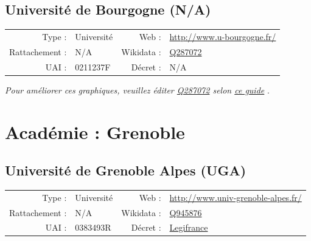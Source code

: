 \documentclass[12pt,french,landscape]{article}
\begin{document}
\hypertarget{universituxe9-de-bourgogne-na}{%
\subsection{Université de Bourgogne
(N/A)}\label{universituxe9-de-bourgogne-na}}

\begin{tabular*}{0.45\textwidth}{rp{2cm}rl}  
\hline  
Type : & Université & Web : &\href{http://www.u-bourgogne.fr/}{http://www.u-bourgogne.fr/} \\  
Rattachement : & N/A & Wikidata : & \href{https://www.wikidata.org/entity/Q287072}{Q287072} \\  
UAI : & 0211237F & Décret : & N/A \\  
\hline  
\end{tabular*}

\textit{\scriptsize Pour améliorer ces graphiques, veuillez éditer \href{https://www.wikidata.org/entity/Q287072}{Q287072}  selon \href{https://github.com/cpesr/wikidataESR/blob/master/Rmd/wikidataESR.md}{ce guide}}
.


\newpage

\hypertarget{acaduxe9mie-grenoble}{%
\section{Académie : Grenoble}\label{acaduxe9mie-grenoble}}

\hypertarget{universituxe9-de-grenoble-alpes-uga}{%
\subsection{Université de Grenoble Alpes
(UGA)}\label{universituxe9-de-grenoble-alpes-uga}}

\begin{tabular*}{0.45\textwidth}{rp{2cm}rl}  
\hline  
Type : & Université & Web : &\href{http://www.univ-grenoble-alpes.fr/}{http://www.univ-grenoble-alpes.fr/} \\  
Rattachement : & N/A & Wikidata : & \href{https://www.wikidata.org/entity/Q945876}{Q945876} \\  
UAI : & 0383493R & Décret : & \href{http://legifrance.gouv.fr/affichTexte.do?cidTexte=JORFTEXT000031147890&dateTexte=&categorieLien=id}{Legifrance} \\  
\hline  
\end{tabular*}
\end{document}
